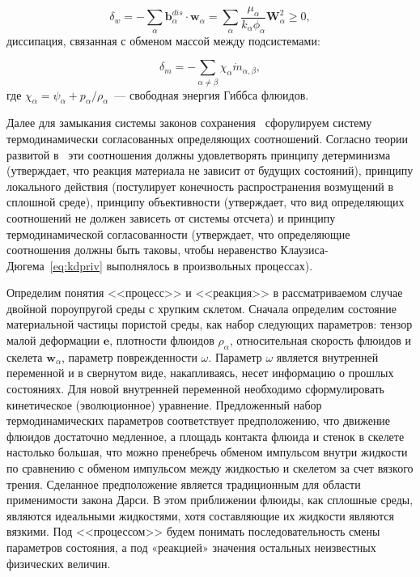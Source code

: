 $$
  \delta_w = - \sum_{\alpha} {\textbf{b}}_{\alpha}^{dis} \cdot {\textbf{w}}_{\alpha} = \sum_{\alpha}{\frac{\mu_{\alpha}}{k_{\alpha} \phi_{\alpha}}\textbf{W}_{\alpha}^2} \geq 0,
$$
диссипация, связанная с обменом массой между подсистемами:

$$
\delta_m = - \sum_{\alpha \neq \beta} \chi_{\alpha} \dot{m}_{\alpha, \beta},
$$
где $\chi_{\alpha} = \psi_{\alpha} + p_{\alpha}/\rho_{\alpha}$~--- свободная энергия Гиббса флюидов.

Далее для замыкания системы законов сохранения~ сфорулируем систему термодинамически согласованных определяющих соотношений. Согласно теории развитой в~\autocite{trusdell1975} эти соотношения должны удовлетворять принципу детерминизма (утверждает, что реакция материала не зависит от будущих состояний), принципу локального действия (постулирует конечность
распространения возмущений в сплошной среде), принципу объективности (утверждает, что вид определяющих соотношений не должен зависеть от системы отсчета) и принципу термодинамической согласованности (утверждает, что
определяющие соотношения должны быть таковы, чтобы неравенство Клаузиса-Дюгема~\eqref{eq:kdpriv} выполнялось в произвольных процессах).

Определим понятия <<процесс>> и <<реакция>> в рассматриваемом случае двойной пороупругой среды с хрупким склетом. Сначала определим состояние материальной частицы пористой среды, как набор следующих параметров: тензор малой деформации $\textbf{e}$, плотности флюидов $\rho_{\alpha}$, относительная скорость флюидов и скелета $\textbf{w}_{\alpha}$, параметр поврежденности $\omega$. Параметр $\omega$ является внутренней переменной и в свернутом виде, накапливаясь, несет информацию о прошлых состояниях. Для новой внутренней переменной необходимо сформулировать кинетическое (эволюционное) уравнение. Предложенный набор термодинамических параметров соответствует предположению, что движение флюидов достаточно медленное, а площадь контакта флюида и стенок в скелете настолько большая, что можно пренебречь обменом импульсом внутри жидкости по сравнению с обменом импульсом между жидкостью и скелетом за счет вязкого трения. Сделанное предположение является традиционным для области применимости закона Дарси. В этом приближении флюиды, как сплошные среды, являются идеальными жидкостями, хотя составляющие их жидкости являются вязкими. Под <<процессом>> будем понимать последовательность смены параметров состояния, а под «реакцией» значения остальных неизвестных физических величин.

